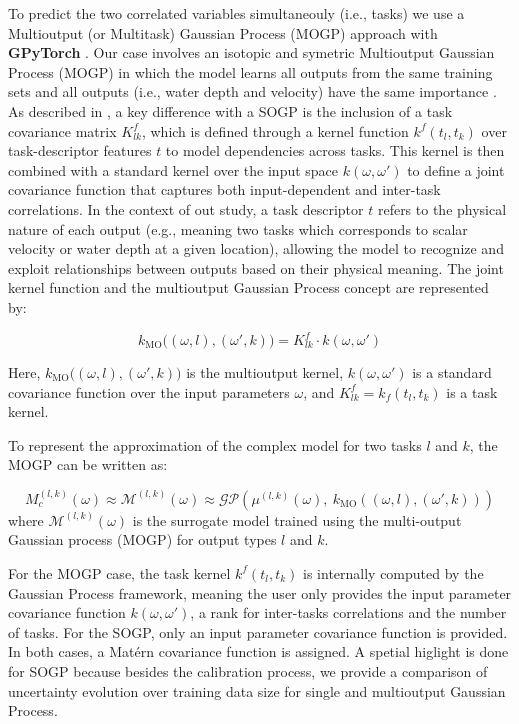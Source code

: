 \documentclass[draft,linenumbers,onecolumn]{agujournal2019} %
\begin{document}
To predict the two correlated variables simultaneouly (i.e., tasks) we use a Multioutput (or Multitask) Gaussian Process (MOGP) approach with \textbf{GPyTorch} \cite{gardner2018gpytorch}. Our case involves an isotopic and symetric Multioutput Gaussian Process (MOGP) in which the model learns all outputs from the same training sets and all outputs (i.e., water depth and velocity) have the same importance \cite{liu2018remarks}. As described in , a key difference with a SOGP is the inclusion of a task covariance matrix \( K_{lk}^{f} \), which is defined through a kernel function \( k^{f}{(t_l, t_k)} \) over task-descriptor features \( t \) to model dependencies across tasks. This kernel is then combined with a standard kernel over the input space \(k(\omega, \omega')\) to define a joint covariance function that captures both input-dependent and inter-task correlations. In the context of out study, a task descriptor \( t \) refers to the physical nature of each output (e.g., meaning two tasks which corresponds to scalar velocity or water depth at a given location), allowing the model to recognize and exploit relationships between outputs based on their physical meaning. The joint kernel function and the multioutput Gaussian Process concept are represented by: 

\[
 k_{\text{MO}}\big((\omega, l), (\omega', k)\big) =  K_{lk}^{f} \cdot k(\omega, \omega')
\]

Here, \( k_{\text{MO}}\big((\omega, l), (\omega', k)\big) \) is the multioutput kernel, \( k(\omega, \omega') \) is a standard covariance function over the input parameters \( \omega \), and  \( K_{lk}^{f} = k_f(t_l, t_k) \) is a task kernel.

To represent the approximation of the complex model for two tasks \( l \) and \( k \), the MOGP can be written as:

\[
M_c^{(l,k)}(\omega) \approx \mathcal{M}^{(l,k)}(\omega) \approx \mathcal{GP}\left(\mu^{(l,k)}(\omega),\ k_{\text{MO}}\left((\omega, l), (\omega', k)\right)\right)
\]
where \( \mathcal{M}^{(l,k)}(\omega) \) is the surrogate model trained using the multi-output Gaussian process (MOGP) for output types \( l \) and \( k \).


For the MOGP case, the task kernel \( k^{f}{(t_l, t_k)} \) is internally computed by the Gaussian Process framework, meaning the user only provides the input parameter covariance function \( k(\omega, \omega') \), a rank for inter-tasks correlations and the number of tasks. For the SOGP, only an input parameter covariance function is provided. In both cases, a Matérn covariance function is assigned. A spetial higlight is done for SOGP because besides the calibration process, we provide a comparison of  uncertainty evolution over training data size for single and multioutput Gaussian Process.  
\end{document}
